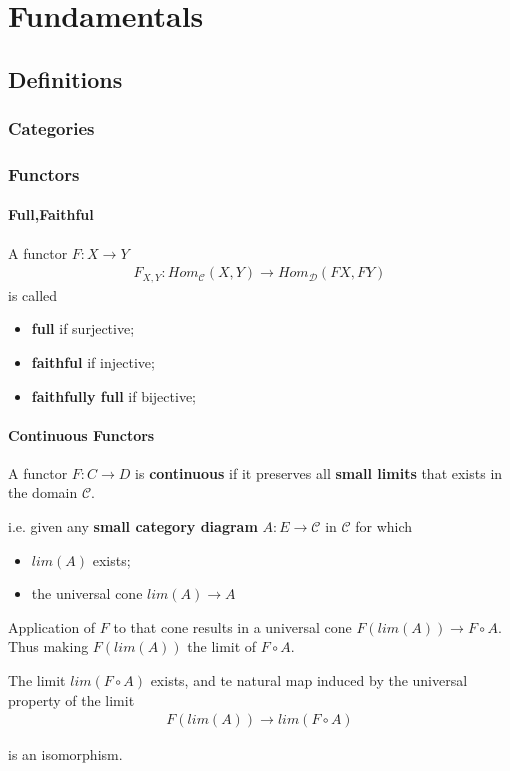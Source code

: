 \documentclass[Total.tex]{subfiles}
\begin{document}
	\chapter{Fundamentals}
		\section{Definitions}
		
			\subsection{Categories}
			
			\subsection{Functors}
				\subsubsection{Full,Faithful}
					\begin{Def}
						A functor $F:X\rightarrow Y$
						\begin{gather*}
							F_{X,Y}:Hom_\mathcal{C}(X,Y)\rightarrow Hom_\mathcal{D}(FX,FY)
						\end{gather*} is called
						\begin{itemize}
							\item \textbf{full} if surjective; 
							\item \textbf{faithful} if injective;
							\item \textbf{faithfully full} if bijective;
						\end{itemize}
					\end{Def}
					\subsubsection{Continuous Functors}
					\begin{Def}
						A functor $F:C\rightarrow D$ is \textbf{continuous} if it preserves all \textbf{small limits} that exists in the domain $\mathcal{C}$.
						
						i.e. given any \textbf{small category diagram} $A:E\rightarrow \mathcal{C}$ in $\mathcal{C}$ for which
						\begin{itemize}
							\item $lim(A)$ exists;
							\item the universal cone $lim(A)\rightarrow A$
						\end{itemize}
						
						Application of $F$ to that cone results in a universal cone $F(lim(A))\rightarrow F\circ A$. Thus making $F(lim(A))$ the limit of $F\circ A$.
						
						The limit $lim(F\circ A)$ exists, and te natural map induced by the universal property of the limit
						\begin{gather*}
							F(lim(A))\rightarrow lim(F\circ A)
						\end{gather*}
						
						is an isomorphism.
					\end{Def}
					
\end{document}
